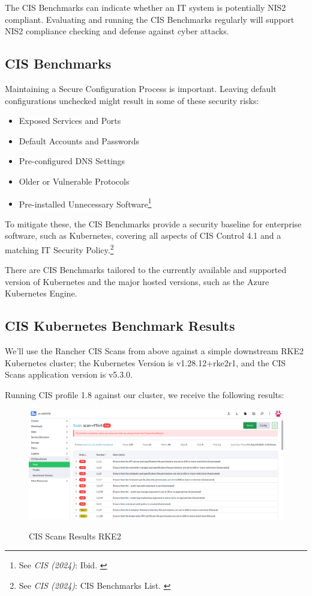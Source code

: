 The CIS Benchmarks can indicate whether an IT system is potentially NIS2 compliant. Evaluating and running the CIS Benchmarks regularly will support NIS2 compliance checking and defense against cyber attacks.

\subsection{CIS Benchmarks}

Maintaining a Secure Configuration Process is important. Leaving default configurations unchecked might result in some of these security risks:

\begin{itemize}
    \item Exposed Services and Ports
    \item Default Accounts and Passwords
    \item Pre-configured DNS Settings
    \item Older or Vulnerable Protocols
    \item Pre-installed Unnecessary Software\footnote{See \textit{CIS (2024)}: Ibid. \cite{cisControls}}
\end{itemize}

To mitigate these, the CIS Benchmarks provide a security baseline for enterprise software, such as Kubernetes, covering all aspects of CIS Control 4.1 and a matching IT Security Policy.\footnote{See \textit{CIS (2024)}: CIS Benchmarks List. \cite{cisBenchmarks}}

There are CIS Benchmarks tailored to the currently available and supported version of Kubernetes and the major hosted versions, such as the Azure Kubernetes Engine.

\subsection{CIS Kubernetes Benchmark Results}

We'll use the Rancher CIS Scans from above against a simple downstream RKE2 Kubernetes cluster; the Kubernetes Version is v1.28.12+rke2r1, and the CIS Scans application version is v5.3.0.

Running CIS profile 1.8 against our cluster, we receive the following results:

\begin{figure}[H]
\centering
\caption {CIS Scans Results RKE2}
\includegraphics[width=\linewidth]{images/cis-scans-3.png}
\label{fig:cisRKE2}
\end{figure}


